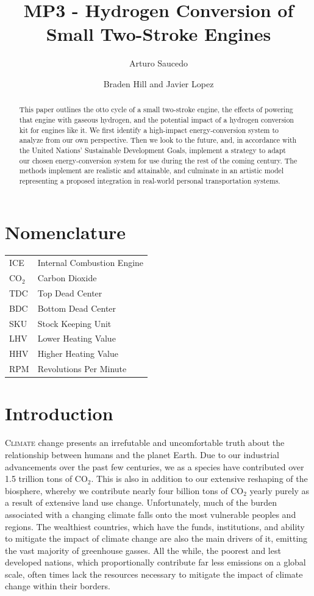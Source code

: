 \documentclass[conf]{new-aiaa}
\title{MP3 - Hydrogen Conversion of Small Two-Stroke Engines}
\author{Arturo Saucedo}
\affil{Department of Aerospace Engineering}
\affil{University of Illinois Urbana-Champaign, Champaign, Illinois, 61820}
\author{Braden Hill and Javier Lopez}
\affil{Department of Mechanical Science \& Engineering}
\affil{University of Illinois Urbana-Champaign, Champaign, Illinois, 61820}
\begin{document}
\maketitle

\begin{abstract}
This paper outlines the otto cycle of a small two-stroke engine, the effects of powering that engine with gaseous hydrogen, and the potential impact of a hydrogen conversion kit for engines like it. We first identify a high-impact energy-conversion system to analyze from our own perspective. Then we look to the future, and, in accordance with the United Nations' Sustainable Development Goals, implement a strategy to adapt our chosen energy-conversion system for use during the rest of the coming century. The methods implement are realistic and attainable, and culminate in an artistic model representing a proposed integration in real-world personal transportation systems.
\end{abstract}

\section{Nomenclature}

{\renewcommand\arraystretch{1.0}
\noindent\begin{longtable*}{@{}l @{\quad=\quad} l@{}}
ICE  & Internal Combustion Engine \\
$\text{CO}_2$ & Carbon Dioxide \\
TDC & Top Dead Center\\
BDC & Bottom Dead Center\\
SKU & Stock Keeping Unit \\
LHV & Lower Heating Value \\
HHV & Higher Heating Value \\
RPM & Revolutions Per Minute \\
\end{longtable*}}

\section{Introduction}
\lettrine{C}{limate} change presents an irrefutable and uncomfortable truth about the relationship between humans and the planet Earth. Due to our industrial advancements over the past few centuries, we as a species have contributed over 1.5 trillion tons of $\text{CO}_2$. \cite{owidco2andgreenhousegasemissions:total} This is also in addition to our extensive reshaping of the biosphere, whereby we contribute nearly four billion tons of $\text{CO}_2$ yearly purely as a result of extensive land use change. \cite{owidco2andgreenhousegasemissions:total} Unfortunately, much of the burden associated with a changing climate falls onto the most vulnerable peoples and regions. The wealthiest countries, which have the funds, institutions, and ability to mitigate the impact of climate change are also the main drivers of it, emitting the vast majority of greenhouse gasses. All the while, the poorest and lest developed nations, which proportionally contribute far less emissions on a global scale, often times lack the resources necessary to mitigate the impact of climate change within their borders.
\end{document}
